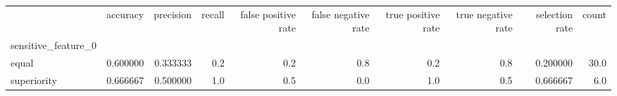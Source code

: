 \begin{tabular}{lrrrrrrrrr}
\toprule
{} &  accuracy &  precision &  recall &  false positive rate &  false negative rate &  true positive rate &  true negative rate &  selection rate &  count \\
sensitive\_feature\_0 &           &            &         &                      &                      &                     &                     &                 &        \\
\midrule
equal               &  0.600000 &   0.333333 &     0.2 &                  0.2 &                  0.8 &                 0.2 &                 0.8 &        0.200000 &   30.0 \\
superiority         &  0.666667 &   0.500000 &     1.0 &                  0.5 &                  0.0 &                 1.0 &                 0.5 &        0.666667 &    6.0 \\
\bottomrule
\end{tabular}
